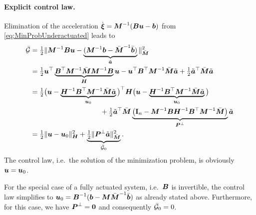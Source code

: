 \paragraph{Explicit control law.}
Elimination of the acceleration $\dot{\boldsymbol{\xi}} = \boldsymbol{M}^{-1}(\boldsymbol{B} \boldsymbol{u} - \boldsymbol{b})$ from \eqref{eq:MinProbUnderactuated} leads to
\begin{align}\label{eq:GaussianUnderactuated}
 \GaussianConstraintC &= \tfrac{1}{2} \norm[\sysInertiaMatC]{\sysInertiaMat^{-1}\sysInputMat \sysInput - \underbrace{(\sysInertiaMat^{-1}\sysForce - \sysInertiaMatC^{-1}\sysForceC)}_{\tilde{\tuple{a}}}}^2
\nonumber\\
 &= \tfrac{1}{2} \sysInput^\top \underbrace{\sysInputMat^\top \sysInertiaMat^{-1} \sysInertiaMatC \sysInertiaMat^{-1} \sysInputMat}_{\mat{H}} \sysInput - \sysInput^\top \sysInputMat^\top \sysInertiaMat^{-1} \sysInertiaMatC \tilde{\tuple{a}} + \tfrac{1}{2} \tilde{\tuple{a}}^\top \sysInertiaMatC \tilde{\tuple{a}}
\nonumber\\
 &= \tfrac{1}{2} \big( \sysInput - \underbrace{\mat{H}^{-1} \sysInputMat^\top \sysInertiaMat^{-1} \sysInertiaMatC \tilde{\tuple{a}}}_{\sysInput_0} \big)^\top \mat{H} \big(\sysInput - \underbrace{\mat{H}^{-1} \sysInputMat^\top \sysInertiaMat^{-1} \sysInertiaMatC \tilde{\tuple{a}}}_{\sysInput_0} \big)
\nonumber\\
 &\hspace{10em}+ \tfrac{1}{2} \tilde{\tuple{a}}^\top \sysInertiaMatC \underbrace{\big( \idMat[\dimConfigSpace] - \sysInertiaMat^{-1} \sysInputMat \mat{H}^{-1} \sysInputMat^\top \sysInertiaMat^{-1} \sysInertiaMatC \big)}_{\mat{P}^\bot} \tilde{\tuple{a}}
\nonumber\\
 &= \tfrac{1}{2} \norm[\mat{H}]{\sysInput - \sysInput_0}^2 + \underbrace{\tfrac{1}{2} \norm[\sysInertiaMatC]{\mat{P}^\bot \tilde{\tuple{a}}}^2}_{\GaussianConstraintC_0}.
\end{align}
The control law, i.e.\ the solution of the minimization problem, is obviously $\boldsymbol{u} = \boldsymbol{u}_0$.

For the special case of a fully actuated system, i.e.\ $\boldsymbol{B}$ is invertible, the control law simplifies to $\boldsymbol{u}_0 = \boldsymbol{B}^{-1} (\boldsymbol{b} - \boldsymbol{M} \bar{\boldsymbol{M}}^{-1}\bar{\boldsymbol{b}})$ as already stated above.
Furthermore, for this case, we have $\boldsymbol{P}^\bot = \boldsymbol{0}$ and consequently $\bar{\mathcal{G}}_0=0$.

